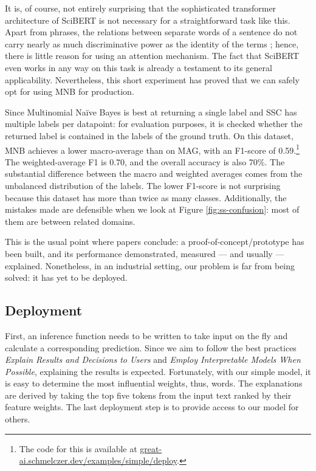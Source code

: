 It is, of course, not entirely surprising that the sophisticated transformer architecture of SciBERT is not necessary for a straightforward task like this. Apart from phrases, the relations between separate words of a sentence do not carry nearly as much discriminative power as the identity of the terms \cite{hand2001idiot}; hence, there is little reason for using an attention mechanism. The fact that SciBERT even works in any way on this task is already a testament to its general applicability. Nevertheless, this short experiment has proved that we can safely opt for using MNB for production.

Since Multinomial Naïve Bayes is best at returning a single label and SSC has multiple labels per datapoint: for evaluation purposes, it is checked whether the returned label is contained in the labels of the ground truth. On this dataset, MNB achieves a lower macro-average than on MAG, with an F1-score of 0.59.\footnote{The code for this is available at \href{https://great-ai.schmelczer.dev/examples/simple/deploy}{great-ai.schmelczer.dev/examples/simple/deploy}.} The weighted-average F1 is 0.70, and the overall accuracy is also 70\%. The substantial difference between the macro and weighted averages comes from the unbalanced distribution of the labels. The lower F1-score is not surprising because this dataset has more than twice as many classes. Additionally, the mistakes made are defensible when we look at Figure \ref{fig:ss-confusion}: most of them are between related domains.

\begin{displayquote}
This is the usual point where papers conclude: a proof-of-concept/prototype has been built, and its performance demonstrated, measured --- and usually --- explained. Nonetheless, in an industrial setting, our problem is far from being solved: it has yet to be deployed.
\end{displayquote}

\subsection{Deployment}

First, an inference function needs to be written to take input on the fly and calculate a corresponding prediction. Since we aim to follow the best practices \textit{Explain Results and Decisions to Users} and \textit{Employ Interpretable Models When Possible}, explaining the results is expected. Fortunately, with our simple model, it is easy to determine the most influential weights, thus, words. The explanations are derived by taking the top five tokens from the input text ranked by their feature weights. The last deployment step is to provide access to our model for others.


